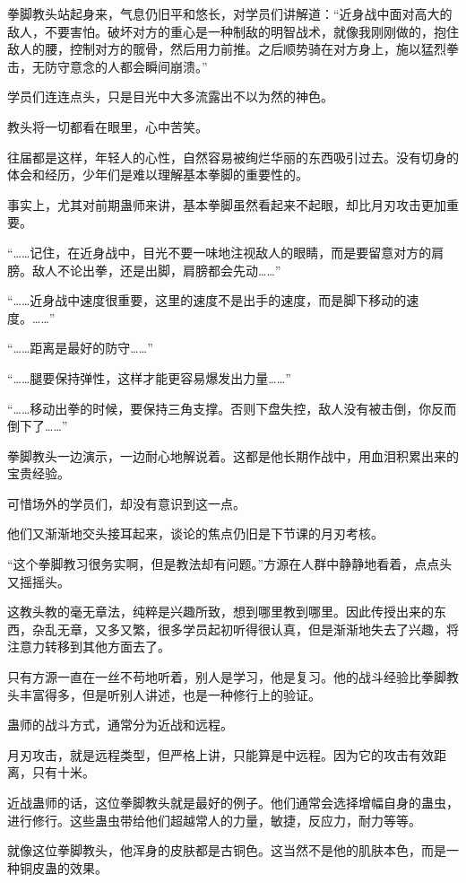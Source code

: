 \begin{this_body}
拳脚教头站起身来，气息仍旧平和悠长，对学员们讲解道：“近身战中面对高大的敌人，不要害怕。破坏对方的重心是一种制敌的明智战术，就像我刚刚做的，抱住敌人的腰，控制对方的髋骨，然后用力前推。之后顺势骑在对方身上，施以猛烈拳击，无防守意念的人都会瞬间崩溃。”

学员们连连点头，只是目光中大多流露出不以为然的神色。

教头将一切都看在眼里，心中苦笑。

往届都是这样，年轻人的心性，自然容易被绚烂华丽的东西吸引过去。没有切身的体会和经历，少年们是难以理解基本拳脚的重要性的。

事实上，尤其对前期蛊师来讲，基本拳脚虽然看起来不起眼，却比月刃攻击更加重要。

“……记住，在近身战中，目光不要一味地注视敌人的眼睛，而是要留意对方的肩膀。敌人不论出拳，还是出脚，肩膀都会先动……”

“……近身战中速度很重要，这里的速度不是出手的速度，而是脚下移动的速度。……”

“……距离是最好的防守……”

“……腿要保持弹性，这样才能更容易爆发出力量……”

“……移动出拳的时候，要保持三角支撑。否则下盘失控，敌人没有被击倒，你反而倒下了……”

拳脚教头一边演示，一边耐心地解说着。这都是他长期作战中，用血泪积累出来的宝贵经验。

可惜场外的学员们，却没有意识到这一点。

他们又渐渐地交头接耳起来，谈论的焦点仍旧是下节课的月刃考核。

“这个拳脚教习很务实啊，但是教法却有问题。”方源在人群中静静地看着，点点头又摇摇头。

这教头教的毫无章法，纯粹是兴趣所致，想到哪里教到哪里。因此传授出来的东西，杂乱无章，又多又繁，很多学员起初听得很认真，但是渐渐地失去了兴趣，将注意力转移到其他方面去了。

只有方源一直在一丝不苟地听着，别人是学习，他是复习。他的战斗经验比拳脚教头丰富得多，但是听别人讲述，也是一种修行上的验证。

蛊师的战斗方式，通常分为近战和远程。

月刃攻击，就是远程类型，但严格上讲，只能算是中远程。因为它的攻击有效距离，只有十米。

近战蛊师的话，这位拳脚教头就是最好的例子。他们通常会选择增幅自身的蛊虫，进行修行。这些蛊虫带给他们超越常人的力量，敏捷，反应力，耐力等等。

就像这位拳脚教头，他浑身的皮肤都是古铜色。这当然不是他的肌肤本色，而是一种铜皮蛊的效果。


\end{this_body}
